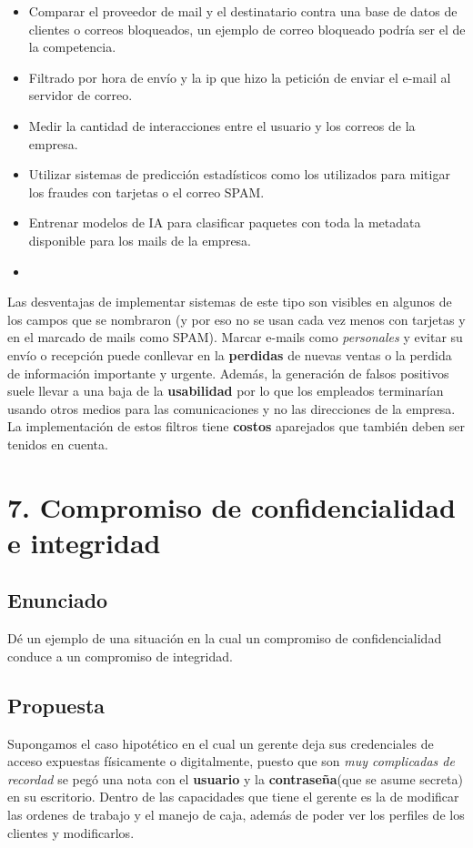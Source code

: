 \documentclass[11pt]{article}
\begin{document}
\begin{itemize}
    \item Comparar el proveedor de mail y el destinatario contra una base de datos de clientes o correos bloqueados, un ejemplo de correo bloqueado podría ser el de la competencia.
    \item Filtrado por hora de envío y la ip que hizo la petición de enviar el e-mail al servidor de correo.
    \item Medir la cantidad de interacciones entre el usuario y los correos de la empresa.
    \item Utilizar sistemas de predicción estadísticos como los utilizados para mitigar los fraudes con tarjetas o el correo SPAM.
    \item Entrenar modelos de IA para clasificar paquetes con toda la metadata disponible para los mails de la empresa.
    \item 
\end{itemize}

Las desventajas de implementar sistemas de este tipo son visibles en algunos de los campos que se nombraron (y por eso no se usan cada vez menos con tarjetas y en el marcado de mails como SPAM). Marcar e-mails como \textit{personales} y evitar su envío o recepción puede conllevar en la \textbf{perdidas} de nuevas ventas o la perdida de información importante y urgente. Además, la generación de falsos positivos suele llevar a una baja de la \textbf{usabilidad} por lo que los empleados terminarían usando otros medios para las comunicaciones y no las direcciones de la empresa. La implementación de estos filtros tiene \textbf{costos} aparejados que también deben ser tenidos en cuenta.

\section*{7. Compromiso de confidencialidad e integridad}
\subsection*{Enunciado}
Dé un ejemplo de una situación en la cual un compromiso de confidencialidad conduce a un compromiso de integridad.
\subsection*{Propuesta}
Supongamos el caso hipotético en el cual un gerente deja sus credenciales de acceso expuestas físicamente o digitalmente, puesto que son \textit{muy complicadas de recordad} se pegó una nota con el \textbf{usuario} y la \textbf{contraseña}(que se asume secreta) en su escritorio. Dentro de las capacidades que tiene el gerente es la de modificar las ordenes de trabajo y el manejo de caja, además de poder ver los perfiles de los clientes y modificarlos.
\end{document}
